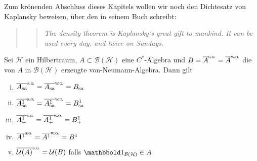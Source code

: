 Zum krönenden Abschluss dieses Kapitels wollen wir noch den Dichtesatz von Kaplansky beweisen, über den \citeauthor{PedC*} in seinem Buch  schreibt:
\begin{quote}
	\foreignblockquote{english}[{\cite[S. 25]{PedC*}}]{\itshape The density theorem is Kaplansky's great gift to mankind. It can be used every day, and twice on Sundays.}
\end{quote}

\begin{satz}[label=satz:624,name={Kaplanskys Dichtesatz}]
	Sei $\mathcal{H}$ ein Hilbertraum, $A \subset \mathcal{B}(\mathcal{H})$ eine $C^*$-Algebra und $B= \overline{A}^\so=\overline{A}^\wo$ die von $A$ in $\mathcal{B}(\mathcal{H})$ erzeugte von-Neumann-Algebra.
	Dann gilt
	\begin{enumerate}[(i),itemsep=2pt]
		\item $\overline{A_\sa}^\so = \overline{A_\sa}^\wo= B_\sa$
		\item $\overline{A_\sa^1}^\so= \overline{A^1_\sa}^\wo = B^1_\sa$
		\item $\overline{A_+^1}^\so = \overline{A_+^1}^\wo= B_+^1$
		\item $\overline{A^1}^\so = \overline{A^1}^\wo = B^1$
		\item $\overline{\mathcal{U}(A)}^\so = \mathcal{U}(B)$ falls $\ind_{\mathcal{B}(\mathcal{H})} \in A$
	\end{enumerate}
\end{satz}

